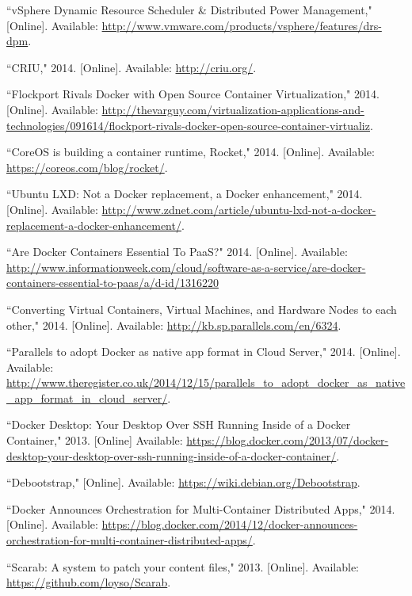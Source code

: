\begin{thebibliography}{99}
\begin{singlespace}
``vSphere Dynamic Resource Scheduler \& Distributed Power Management," [Online]. Available: \url{http://www.vmware.com/products/vsphere/features/drs-dpm}.

``CRIU," 2014. [Online]. Available: \url{http://criu.org/}.

``Flockport Rivals Docker with Open Source Container Virtualization," 2014. [Online]. Available: \url{http://thevarguy.com/virtualization-applications-and-technologies/091614/flockport-rivals-docker-open-source-container-virtualiz}.

``CoreOS is building a container runtime, Rocket," 2014. [Online]. Available: \url{https://coreos.com/blog/rocket/}.

``Ubuntu LXD: Not a Docker replacement, a Docker enhancement," 2014. [Online]. Available: \url{http://www.zdnet.com/article/ubuntu-lxd-not-a-docker-replacement-a-docker-enhancement/}.

``Are Docker Containers Essential To PaaS?" 2014. [Online]. Available: \url{http://www.informationweek.com/cloud/software-as-a-service/are-docker-containers-essential-to-paas/a/d-id/1316220}

``Converting Virtual Containers, Virtual Machines, and Hardware Nodes to each other," 2014. [Online]. Available: \url{http://kb.sp.parallels.com/en/6324}.

``Parallels to adopt Docker as native app format in Cloud Server," 2014. [Online]. Available: \url{http://www.theregister.co.uk/2014/12/15/parallels_to_adopt_docker_as_native_app_format_in_cloud_server/}.

``Docker Desktop: Your Desktop Over SSH Running Inside of a Docker Container," 2013. [Online] Available: \url{https://blog.docker.com/2013/07/docker-desktop-your-desktop-over-ssh-running-inside-of-a-docker-container/}.

``Debootstrap," [Online]. Available: \url{https://wiki.debian.org/Debootstrap}.

``Docker Announces Orchestration for Multi-Container Distributed Apps," 2014. [Online]. Available: \url{https://blog.docker.com/2014/12/docker-announces-orchestration-for-multi-container-distributed-apps/}.

``Scarab: A system to patch your content files," 2013. [Online]. Available: \url{https://github.com/loyso/Scarab}.


\end{singlespace}
\end{thebibliography}
